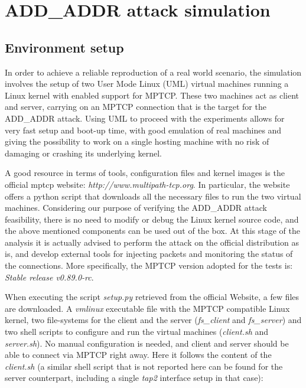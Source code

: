 \chapter{ADD\_ADDR attack simulation}
\label{chap:addaddrattackexecution}

\section{Environment setup}
In order to achieve a reliable reproduction of a real world scenario, the simulation involves the setup of two User Mode Linux (UML) virtual machines running a Linux kernel with enabled support for MPTCP. These two machines act as client and server, carrying on an MPTCP connection that is the target for the ADD\_ADDR attack. 
Using UML to proceed with the experiments allows for very fast setup and boot-up time, with good emulation of real machines and giving the possibility to work on a single hosting machine with no risk of damaging or crashing its underlying kernel.

A good resource in terms of tools, configuration files and kernel images is the official mptcp website:
\textit{http://www.multipath-tcp.org}. In particular, the website offers a python script that downloads all the necessary files to run the two virtual machines. Considering our purpose of verifying the ADD\_ADDR attack feasibility, there is no need to modify or debug the Linux kernel source code, and the above mentioned components can be used out of the box. At this stage of the analysis it is actually advised to perform the attack on the official distribution as is, and develop external tools for injecting packets and monitoring the status of the connections. More specifically, the MPTCP version adopted for the tests is: \textit{Stable release v0.89.0-rc}.

When executing the script \textit{setup.py} retrieved from the official Website, a few files are downloaded. A \textit{vmlinux} executable file with the MPTCP compatible Linux kernel, two file-systems for the client and the server (\textit{fs\_client} and \textit{fs\_server}) and two shell scripts to configure and run the virtual machines (\textit{client.sh} and \textit{server.sh}). No manual configuration is needed, and client and server should be able to connect via MPTCP right away.
Here it follows the content of the \textit{client.sh} (a similar shell script that is not reported here can be found for the server counterpart, including a single \textit{tap2} interface setup in that case):


